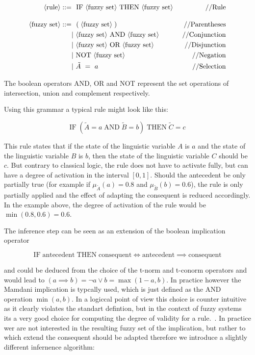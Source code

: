 \newcommand{\fuzzyrule}{\langle \text{rule} \rangle}


\begin{align*}
      \fuzzyrule  ::= & \ \ \text{IF} \ \fuzzyset \ \text{THEN} \ \fuzzyset & \text { //Rule}        \\[10pt]
      \fuzzyset  ::=  & \ \ (\; \fuzzyset \;)                               & \text { //Parentheses} \\
                      & |  \ \fuzzyset \ \text{AND}  \ \fuzzyset            & \text { //Conjunction} \\
                      & |  \ \fuzzyset \ \text{OR} \  \fuzzyset             & \text { //Disjunction} \\
                      & |  \ \text{NOT} \ \fuzzyset                         & \text { //Negation}    \\
                      & |  \ \tilde{A} \ =\ a                               & \text { //Selection}   \\
\end{align*}

The boolean operators AND, OR and NOT represent the set operations of intersection, union and complement respectively.


Using this grammar a typical rule might look like this:

\begin{equation}
      \text{IF} \;( \tilde{A} = a \; \text{AND} \; \tilde{B} = b )\; \text{THEN} \; \tilde{C} = c
\end{equation}

This rule states that if the state of the linguistic variable $A$ is $a$ and the state of the linguistic variable $B$ is $b$, then the state of the linguistic variable $C$ should be $c$. But contrary to classical logic, the rule does not have to activate fully, but can have a degree of activation in the interval $[0, 1]$. Should the antecedent be only partially true (for example if $\mu_{\tilde{A}}(a) = 0.8$ and $\mu_{\tilde{B}}(b) = 0.6$), the rule is only partially applied and the effect of adapting the consequent is reduced accordingly. In the example above, the degree of activation of the rule would be $\min(0.8, 0.6) = 0.6$.

The inference step can be seen as an extension of the boolean implication operator

\[\text{IF} \; \text{antecedent} \; \text{THEN} \; \text{consequent} \iff \text{antecedent} \implies \text{consequent}\]

and could be deduced from the choice of the t-norm and t-conorm operators and would lead to $(a \implies b) = \neg a \lor b = \max(1-a,b)$. In practice however the Mamdani implication is typcally used, which is just defined as the AND operation $\min(a,b)$. In a logiccal point of view this choice is counter intuitive as it clearly violates the standart defintion, but in the context of fuzzy systems its a very good choice for computing the degree of validity for a rule.~\cite{BouchonMeunier1995}. In practice wer are not interested in the resulting fuzzy set of the implication, but rather to which extend the consequent should be adapted therefore we introduce a slightly different infernence algorithm:

